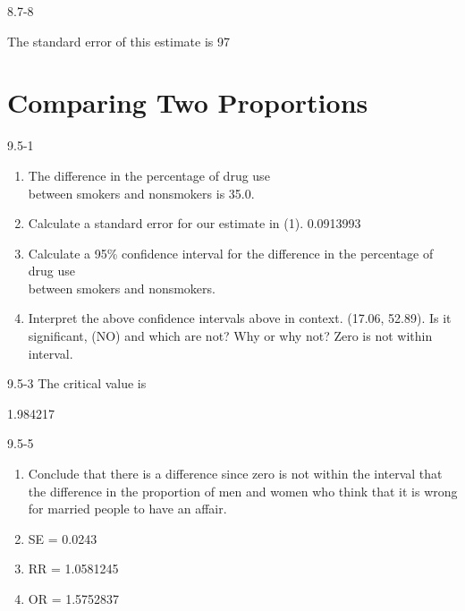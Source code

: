 \begin{exsol@solution}{8.7-8}

The standard error of this estimate is 97

\end{exsol@solution}
\setcounter{chapter}{8}\chapter{Comparing Two Proportions }
\begin{exsol@solution}{9.5-1}


\begin{enumerate}
\item The difference in the percentage of drug use \\ between smokers and nonsmokers is 35.0.
\item Calculate a standard error for our estimate in (1).  0.0913993
\item Calculate a 95\% confidence interval for the difference in the percentage of drug use \\ between smokers and nonsmokers.
\item Interpret the above confidence intervals above in context.  (17.06, 52.89). Is it significant, (NO) and which are not? Why or why not? Zero is not within interval.
\end{enumerate}

\end{exsol@solution}
\begin{exsol@solution}{9.5-3}
   The critical value is


  1.984217

\end{exsol@solution}
\begin{exsol@solution}{9.5-5}



	  \begin{enumerate}
	  \item Conclude that there is a difference since zero is not within the interval that the difference in the proportion of men and women who think that it is wrong for married people to have an affair.
	  \item SE = 0.0243
	  \item RR = 1.0581245
	  \item OR = 1.5752837
	  \end{enumerate}

\end{exsol@solution}
